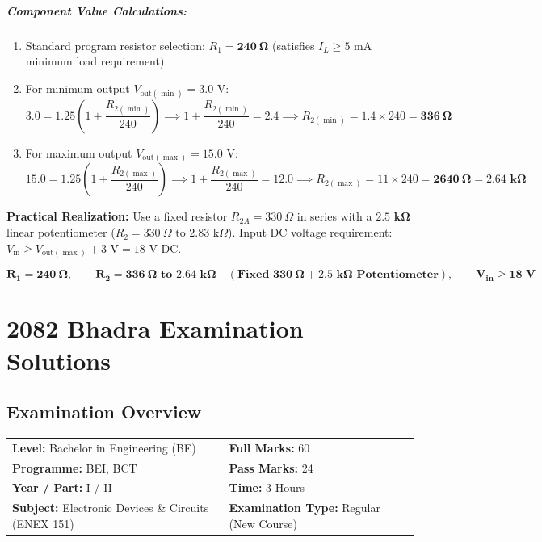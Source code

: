 \documentclass[11pt,a4paper,oneside]{book}
\begin{document}
\paragraph{Component Value Calculations:}
\begin{enumerate}[leftmargin=1.5em]
  \item Standard program resistor selection: $R_1 = \mathbf{240\ \Omega}$ (satisfies $I_L \ge 5\text{ mA}$ minimum load requirement).
  \item For minimum output $V_{\text{out}(\min)} = 3.0\text{ V}$:
  \[
  3.0 = 1.25 \left(1 + \frac{R_{2(\min)}}{240}\right) \implies 1 + \frac{R_{2(\min)}}{240} = 2.4 \implies R_{2(\min)} = 1.4 \times 240 = \mathbf{336\ \Omega}
  \]
  \item For maximum output $V_{\text{out}(\max)} = 15.0\text{ V}$:
  \[
  15.0 = 1.25 \left(1 + \frac{R_{2(\max)}}{240}\right) \implies 1 + \frac{R_{2(\max)}}{240} = 12.0 \implies R_{2(\max)} = 11 \times 240 = \mathbf{2640\ \Omega} = \mathbf{2.64\text{ k}\Omega}
  \]
\end{enumerate}
\textbf{Practical Realization:} Use a fixed resistor $R_{2A} = 330\ \Omega$ in series with a $\mathbf{2.5\text{ k}\Omega}$ linear potentiometer ($R_2 = 330\ \Omega \text{ to } 2.83\text{ k}\Omega$). Input DC voltage requirement: $V_{\text{in}} \ge V_{\text{out}(\max)} + 3\text{ V} = 18\text{ V DC}$.

\begin{answerbox}
$$\mathbf{R_1 = 240\ \Omega, \qquad R_2 = 336\ \Omega \text{ to } 2.64\text{ k}\Omega \quad (\text{Fixed } 330\ \Omega + 2.5\text{ k}\Omega \text{ Potentiometer}), \qquad V_{\text{in}} \ge 18\text{ V}}$$
\end{answerbox}

\chapter{2082 Bhadra Examination Solutions}

\section*{Examination Overview}
\begin{tabular}{@{}ll@{}}
\textbf{Level:} Bachelor in Engineering (BE) & \textbf{Full Marks:} 60 \\
\textbf{Programme:} BEI, BCT & \textbf{Pass Marks:} 24 \\
\textbf{Year / Part:} I / II & \textbf{Time:} 3 Hours \\
\textbf{Subject:} Electronic Devices \& Circuits (ENEX 151) & \textbf{Examination Type:} Regular (New Course) \\
\end{tabular}
\end{document}
